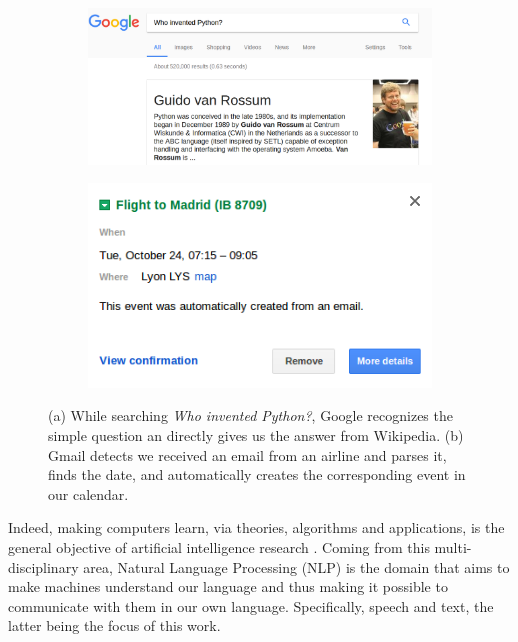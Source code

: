 \begin{figure}[t]
\centering
	\begin{subfigure}[b]{0.55\textwidth}
	\includegraphics[width=1\linewidth]{./images/Chapitre1/guido_google.png}
	\caption{}
\end{subfigure}

	\begin{subfigure}[b]{0.55\textwidth}
	\includegraphics[width=1\linewidth]{./images/Chapitre1/calendar2.png}
	\caption{}
\end{subfigure}
\caption{(a) While searching \textit{Who invented Python?}, Google recognizes the simple question an directly gives us the answer from Wikipedia. (b) Gmail detects we received an email from an airline and parses it, finds the date, and automatically creates the corresponding event in our calendar.}	
\label{fig:google_nlp}
\end{figure}
%
Indeed, making computers learn,  via theories, algorithms and applications, is the general objective of artificial intelligence research \cite{Sugiyama2015}. Coming from this multi-disciplinary area, Natural Language Processing (NLP) is the domain that aims to make machines understand our language \cite{JurafskyM09} and thus making it possible to communicate with them in our own language. Specifically, speech and text, the latter being the focus of this work.


